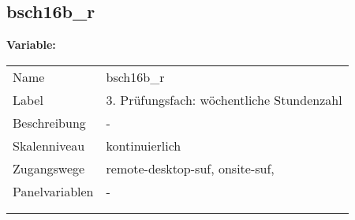 	
	
	\subsection{bsch16b\_r}
	\label{subSection:bsch16b_r}

	\noindent\textbf{Variable:}\\
		\begin{tabular}{lL{11.3cm}}
			\label{tableVariable:bsch16b_r}
			Name & bsch16b\_r \\
			Label & 3. Prüfungsfach: wöchentliche Stundenzahl \\
			Beschreibung & - \\
			Skalenniveau & kontinuierlich \\
			Zugangswege &
				remote-desktop-suf,
				onsite-suf,
 \\
			Panelvariablen & -
			 \\
			 \\
 \\
		\end{tabular}





